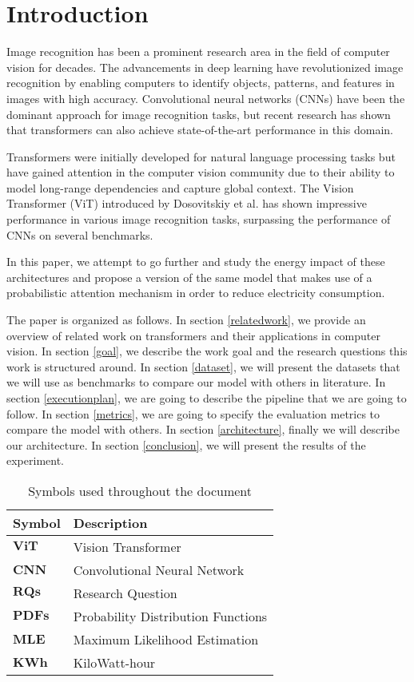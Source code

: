 \section{Introduction}
Image recognition has been a prominent research area in the field of computer vision for decades. The advancements in deep learning have revolutionized image recognition by enabling computers to identify objects, patterns, and features in images with high accuracy. Convolutional neural networks (CNNs) have been the dominant approach for image recognition tasks, but recent research has shown that transformers can also achieve state-of-the-art performance in this domain.

Transformers were initially developed for natural language processing tasks but have gained attention in the computer vision community due to their ability to model long-range dependencies and capture global context. The Vision Transformer (ViT) introduced by Dosovitskiy et al. \cite{DBLP:journals/corr/abs-2010-11929} has shown impressive performance in various image recognition tasks, surpassing the performance of CNNs on several benchmarks.

In this paper, we attempt to go further and study the energy impact of these architectures and propose a version of the same model that makes use of a probabilistic attention mechanism in order to reduce electricity consumption.

The paper is organized as follows. In section \ref{relatedwork}, we provide an overview of related work on transformers and their applications in computer vision.  In section \ref{goal}, we describe the work goal and the research questions this work is structured around. In section \ref{dataset}, we will present the datasets that we will use as benchmarks to compare our model with others in literature. In section \ref{executionplan}, we are going to describe the pipeline that we are going to follow. In section \ref{metrics}, we are going to specify the evaluation metrics to compare the model with others. In section \ref{architecture}, finally we will describe our architecture. In section \ref{conclusion}, we will present the results of the experiment.

\begin{table}[h]
\centering
\begin{tabular}{|l|l|}
\hline
\textbf{Symbol} & \textbf{Description}        \\ \hline
$ \textbf{ViT}$              & Vision Transformer \\
$ \textbf{CNN}$              & Convolutional Neural Network \\
$ \textbf{RQs}$              & Research Question \\
$ \textbf{PDFs}$              & Probability Distribution Functions \\
$ \textbf{MLE}$              & Maximum Likelihood Estimation \\
$ \textbf{KWh}$              & KiloWatt-hour \\


\hline
\end{tabular}
\caption{Symbols used throughout the document}
\label{tab:symbols-table}
\end{table}
